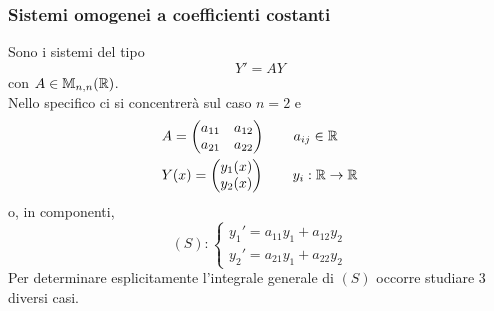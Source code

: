 \subsubsection{Sistemi omogenei a coefficienti costanti}
Sono i sistemi del tipo
\begin{equation*}
    Y'=AY
\end{equation*}
con $A \in \mathbb{M}_{n,n}(\mathbb{R})$.\\
Nello specifico ci si concentrerà sul caso $n=2$ e
\begin{align}    
    &A=\begin{pmatrix}
        a_{11} & a_{12}\\
        a_{21} & a_{22}
    \end{pmatrix} \qquad a_{ij} \in \mathbb{R} \\
    &Y(x)=\begin{pmatrix}
        y_1(x)\\
        y_2(x)
    \end{pmatrix} \qquad y_i:\mathbb{R} \to \mathbb{R}
\end{align}
o, in componenti,
\begin{equation*}
    (S): \begin{cases}
        y_1'=a_{11} y_1 + a_{12} y_2\\
        y_2'=a_{21} y_1 + a_{22} y_2
    \end{cases}
\end{equation*}
Per determinare esplicitamente l'integrale generale di $(S)$ occorre studiare 3 diversi casi.
